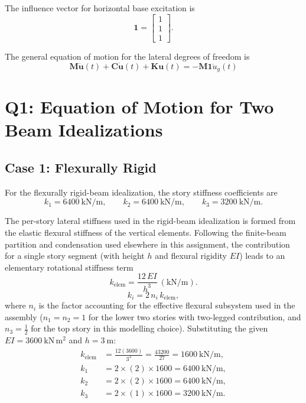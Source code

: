 \documentclass[11pt,a4paper]{article}
\begin{document}
The influence vector for horizontal base excitation is
\begin{equation}
\bm{1}=\begin{bmatrix}1\\1\\1\end{bmatrix}.
\end{equation}

The general equation of motion for the lateral degrees of freedom is
\begin{equation}
\boxed{
\bm{M}\ddot{\bm{u}}(t)+\bm{C}\dot{\bm{u}}(t)+\bm{K}\bm{u}(t)
=-\bm{M}\bm{1}\ddot{u}_g(t)
}
\end{equation}
\pagebreak
\section{Q1: Equation of Motion for Two Beam Idealizations}
\subsection{Case 1: Flexurally Rigid}
For the flexurally rigid-beam idealization, the story stiffness coefficients are
\begin{equation}
k_1=6400\ \mathrm{kN/m},
\qquad
k_2=6400\ \mathrm{kN/m},
\qquad
k_3=3200\ \mathrm{kN/m}.
\end{equation}

The per-story lateral stiffness used in the rigid-beam idealization is formed from the elastic flexural stiffness of the vertical elements. Following the finite-beam partition and condensation used elsewhere in this assignment, the contribution for a single story segment (with height $h$ and flexural rigidity $EI$) leads to an elementary rotational stiffness term
\begin{equation}
k_{\mathrm{elem}}=\frac{12\,EI}{h^3}\ \mathrm{(kN/m)}.
\end{equation}
\begin{equation}
k_i = 2\,n_i\,k_{\mathrm{elem}},
\end{equation}
where $n_i$ is the factor accounting for the effective flexural subsystem used in the assembly ($n_1=n_2=1$ for the lower two stories with two-legged contribution, and $n_3=\tfrac{1}{2}$ for the top story in this modelling choice). Substituting the given $EI=3600\ \mathrm{kN\,m^2}$ and $h=3\ \mathrm{m}$:
\begin{align}
k_{\mathrm{elem}} &= \frac{12(3600)}{3^3} = \frac{43200}{27} = 1600\ \mathrm{kN/m},\\
k_1 &= 2\times(2)\times1600 = 6400\ \mathrm{kN/m},\\
k_2 &= 2\times(2)\times1600 = 6400\ \mathrm{kN/m},\\
k_3 &= 2\times(1)\times1600 = 3200\ \mathrm{kN/m}.
\end{align}
\end{document}
